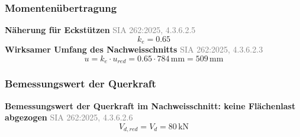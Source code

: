 \documentclass[11pt,a4paper]{article}
\newcommand{\normref}[1]{{\small\textcolor{gray}{#1}}}
\begin{document}
\subsubsection{Momentenübertragung}
\noindent\textbf{Näherung für Eckstützen} \hfill \normref{SIA 262:2025, 4.3.6.2.5}
\begin{equation*}
k_e = 0.65
\end{equation*}
\noindent\textbf{Wirksamer Umfang des Nachweisschnitts} \hfill \normref{SIA 262:2025, 4.3.6.2.3}
\begin{equation*}
u = k_e \cdot u_{red} = 0.65 \cdot 784\,\mathrm{mm} = 509\,\mathrm{mm}
\end{equation*}
\subsubsection{Bemessungswert der Querkraft}
\noindent\textbf{Bemessungswert der Querkraft im Nachweisschnitt: keine Flächenlast abgezogen} \hfill \normref{SIA 262:2025, 4.3.6.2.6}
\begin{equation*}
V_{d,red} = V_d = 80\,\mathrm{kN}
\end{equation*}
\end{document}
